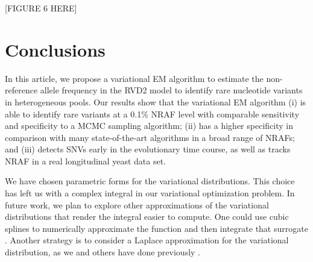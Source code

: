 \documentclass{bmcart}
\begin{document}
\vspace{2em}
\begin{center}
[FIGURE 6 HERE]  
\end{center}
\vspace{2em}



\section{Conclusions}
In this article, we propose a variational EM algorithm to estimate the non-reference allele frequency in the RVD2 model to identify rare nucleotide variants in heterogeneous pools.
Our results show that the variational EM algorithm
(i) is able to identify rare variants at a 0.1\% NRAF level with comparable sensitivity and specificity to a MCMC sampling algorithm;
(ii) has a higher specificity in comparison with many state-of-the-art algorithms in a broad range of NRAFs;
and (iii) detects SNVs early in the evolutionary time course, as well as tracks NRAF in a real longitudinal yeast data set.

We have chosen parametric forms for the variational distributions.
This choice has left us with a complex integral in our variational optimization problem.
In future work, we plan to explore other approximations of the variational distributions that render the integral easier to compute.
One could use cubic splines to numerically approximate the function and then integrate that surrogate \cite{de1978practical}.
Another strategy is to consider a Laplace approximation for the variational distribution, as we and others have done previously \cite{saddiki2014glad, wang2013variational}.

\end{document}

